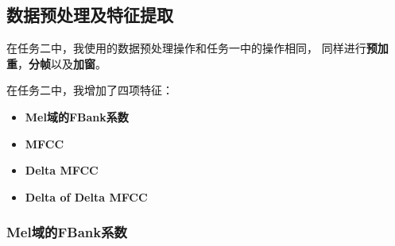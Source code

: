 \documentclass[a4paper]{article}
\begin{document}
\subsection{数据预处理及特征提取}

在任务二中，我使用的数据预处理操作和任务一中的操作相同，
同样进行\textbf{预加重}，\textbf{分帧}以及\textbf{加窗}。

在任务二中，我增加了四项特征：
\begin{itemize}
  \item \textbf{Mel域的FBank系数}
  \item \textbf{MFCC}
  \item \textbf{Delta MFCC}
  \item \textbf{Delta of Delta MFCC}
\end{itemize}

\subsubsection{Mel域的FBank系数}
\end{document}
